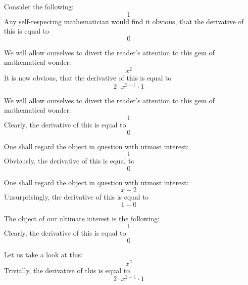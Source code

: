 \documentclass{article}
\begin{document}
Consider the following:
\begin{equation}
1 
\end{equation}
Any self-respecting mathematician would find it obvious, that the derivative of this is equal to
\begin{equation}
0 
\end{equation}

We will allow ourselves to divert the reader's attention to this gem of mathematical wonder:
\begin{equation}
x ^{2 } 
\end{equation}
It is now obvious, that the derivative of this is equal to
\begin{equation}
2 \cdot x ^{2 - 1 } \cdot 1 
\end{equation}

We will allow ourselves to divert the reader's attention to this gem of mathematical wonder:
\begin{equation}
1 
\end{equation}
Clearly, the derivative of this is equal to
\begin{equation}
0 
\end{equation}

One shall regard the object in question with utmost interest:
\begin{equation}
1 
\end{equation}
Obviously, the derivative of this is equal to
\begin{equation}
0 
\end{equation}

One shall regard the object in question with utmost interest:
\begin{equation}
x - 2 
\end{equation}
Unsurprisingly, the derivative of this is equal to
\begin{equation}
1 - 0 
\end{equation}

The object of our ultimate interest is the following:
\begin{equation}
1 
\end{equation}
Clearly, the derivative of this is equal to
\begin{equation}
0 
\end{equation}

Let us take a look at this:
\begin{equation}
x ^{2 } 
\end{equation}
Trivially, the derivative of this is equal to
\begin{equation}
2 \cdot x ^{2 - 1 } \cdot 1 
\end{equation}
\end{document}
